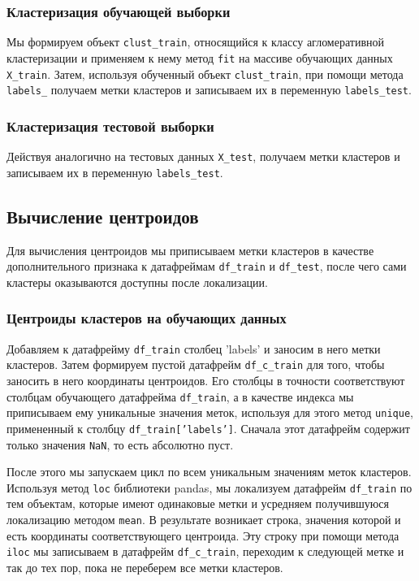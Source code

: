\documentclass[a4paper,12pt]{article}
\begin{document}
\subsubsection{Кластеризация обучающей выборки}

Мы формируем объект \texttt{clust\_train}, относящийся к классу агломеративной кластеризации и применяем к нему метод \texttt{fit} на массиве обучающих данных \texttt{X\_train}. Затем, используя обученный объект \texttt{clust\_train}, при помощи метода \texttt{labels\_} получаем метки кластеров и записываем их в переменную \texttt{labels\_test}.

\subsubsection{Кластеризация тестовой  выборки }

Действуя аналогично на тестовых данных \texttt{X\_test}, получаем метки кластеров и записываем их в переменную \texttt{labels\_test}.

\subsection{Вычисление центроидов}


Для вычисления центроидов мы приписываем метки кластеров в качестве дополнительного признака к датафреймам \texttt{df\_train} и \texttt{df\_test}, после чего сами кластеры оказываются доступны после локализации.


\subsubsection{Центроиды кластеров на обучающих данных}

Добавляем к датафрейму \texttt{df\_train} столбец 'labels' и заносим в него метки кластеров. Затем формируем пустой датафрейм \texttt{df\_c\_train} для того, чтобы заносить в него координаты центроидов. Его столбцы в точности соответствуют столбцам обучающего датафрейма \texttt{df\_train}, а в качестве индекса мы приписываем ему уникальные значения меток, используя для этого метод \texttt{unique}, примененный к столбцу \texttt{df\_train['labels']}. Сначала этот датафрейм содержит только значения \texttt{NaN}, то есть абсолютно пуст.

После этого мы запускаем цикл по всем уникальным значениям меток кластеров. Используя метод \texttt{loc} библиотеки pandas, мы локализуем датафрейм \texttt{df\_train} по тем объектам, которые имеют одинаковые метки и усредняем получившуюся локализацию методом \texttt{mean}. В результате возникает строка, значения которой и есть координаты соответствующего центроида. Эту строку при помощи метода \texttt{iloc} мы записываем в датафрейм \texttt{df\_c\_train}, переходим к следующей метке и так до тех пор, пока не переберем все метки кластеров.
\end{document}
